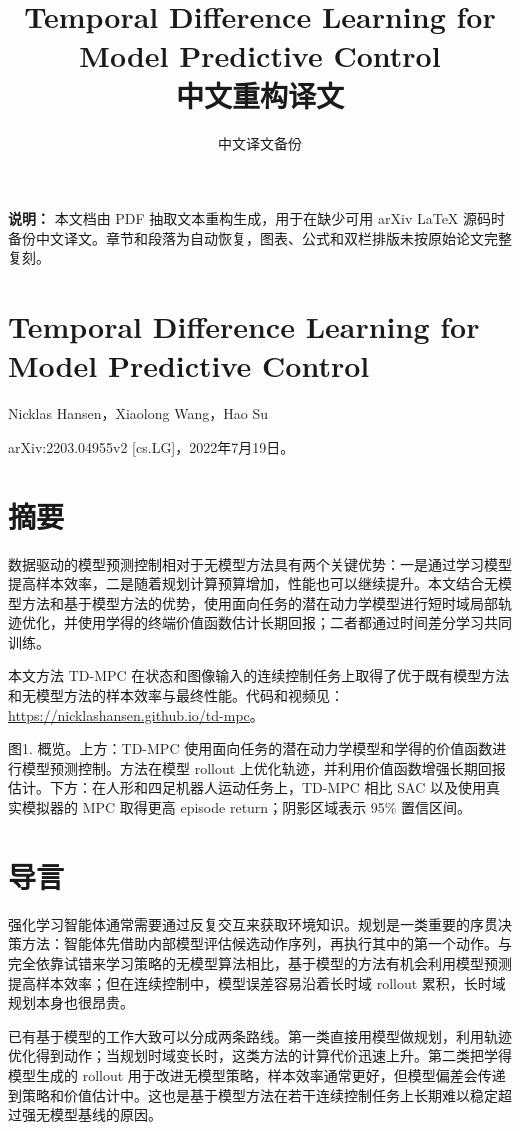 \documentclass[10pt]{article}
\title{Temporal Difference Learning for Model Predictive Control\\[0.5em]\large 中文重构译文}
\author{中文译文备份}
\date{}
\begin{document}
\maketitle

\noindent\textbf{说明：} 本文档由 PDF 抽取文本重构生成，用于在缺少可用 arXiv LaTeX 源码时备份中文译文。章节和段落为自动恢复，图表、公式和双栏排版未按原始论文完整复刻。

\bigskip

\section*{Temporal Difference Learning for Model Predictive Control}

Nicklas Hansen，Xiaolong Wang，Hao Su

arXiv:2203.04955v2 [cs.LG]，2022年7月19日。

\section*{摘要}
数据驱动的模型预测控制相对于无模型方法具有两个关键优势：一是通过学习模型提高样本效率，二是随着规划计算预算增加，性能也可以继续提升。本文结合无模型方法和基于模型方法的优势，使用面向任务的潜在动力学模型进行短时域局部轨迹优化，并使用学得的终端价值函数估计长期回报；二者都通过时间差分学习共同训练。

本文方法 TD-MPC 在状态和图像输入的连续控制任务上取得了优于既有模型方法和无模型方法的样本效率与最终性能。代码和视频见：\url{https://nicklashansen.github.io/td-mpc}。

图1. 概览。上方：TD-MPC 使用面向任务的潜在动力学模型和学得的价值函数进行模型预测控制。方法在模型 rollout 上优化轨迹，并利用价值函数增强长期回报估计。下方：在人形和四足机器人运动任务上，TD-MPC 相比 SAC 以及使用真实模拟器的 MPC 取得更高 episode return；阴影区域表示 95\% 置信区间。

\section{导言}
强化学习智能体通常需要通过反复交互来获取环境知识。规划是一类重要的序贯决策方法：智能体先借助内部模型评估候选动作序列，再执行其中的第一个动作。与完全依靠试错来学习策略的无模型算法相比，基于模型的方法有机会利用模型预测提高样本效率；但在连续控制中，模型误差容易沿着长时域 rollout 累积，长时域规划本身也很昂贵。

已有基于模型的工作大致可以分成两条路线。第一类直接用模型做规划，利用轨迹优化得到动作；当规划时域变长时，这类方法的计算代价迅速上升。第二类把学得模型生成的 rollout 用于改进无模型策略，样本效率通常更好，但模型偏差会传递到策略和价值估计中。这也是基于模型方法在若干连续控制任务上长期难以稳定超过强无模型基线的原因。
\end{document}
